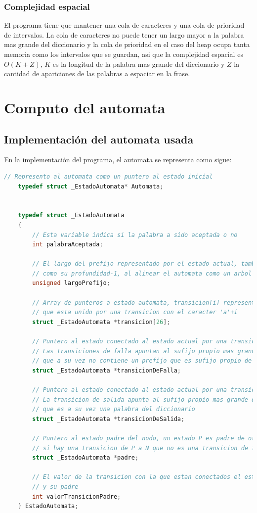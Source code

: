 \documentclass{article}
\begin{document}
\subsubsection*{Complejidad espacial}
El programa tiene que mantener una cola de caracteres y una cola de prioridad de intervalos. La cola de caracteres no puede tener un largo mayor a la palabra mas grande del diccionario y
la cola de prioridad en el caso del heap ocupa tanta memoria como los intervalos que se guardan, asi que la complejidad espacial es $O(K+Z)$, $K$ es la longitud de la palabra mas grande del diccionario
y $Z$ la cantidad de apariciones de las palabras a espaciar en la frase.

\section*{Computo del automata}

\subsection*{Implementación del automata usada}

En la implementación del programa, el automata se representa como sigue:
\begin{lstlisting}[language=C]
    // Represento al automata como un puntero al estado inicial
    typedef struct _EstadoAutomata* Automata;

    
    typedef struct _EstadoAutomata
    {
        // Esta variable indica si la palabra a sido aceptada o no
        int palabraAceptada;

        // El largo del prefijo representado por el estado actual, tambien puede entenderse
        // como su profundidad-1, al alinear el automata como un arbol
        unsigned largoPrefijo;

        // Array de punteros a estado automata, transicion[i] representa al hijo del nodo actual
        // que esta unido por una transicion con el caracter 'a'+i
        struct _EstadoAutomata *transicion[26];

        // Puntero al estado conectado al estado actual por una transicion de falla
        // Las transiciones de falla apuntan al sufijo propio mas grande del prefijo actual
        // que a su vez no contiene un prefijo que es sufijo propio de una palabra del diccionario
        struct _EstadoAutomata *transicionDeFalla;

        // Puntero al estado conectado al estado actual por una transicion de salida
        // La transicion de salida apunta al sufijo propio mas grande del prefijo actual
        // que es a su vez una palabra del diccionario
        struct _EstadoAutomata *transicionDeSalida;

        // Puntero al estado padre del nodo, un estado P es padre de otro estado N
        // si hay una transicion de P a N que no es una transicion de falla
        struct _EstadoAutomata *padre;

        // El valor de la transicion con la que estan conectados el estado actual
        // y su padre
        int valorTransicionPadre;
    } EstadoAutomata;
\end{lstlisting}
\end{document}
